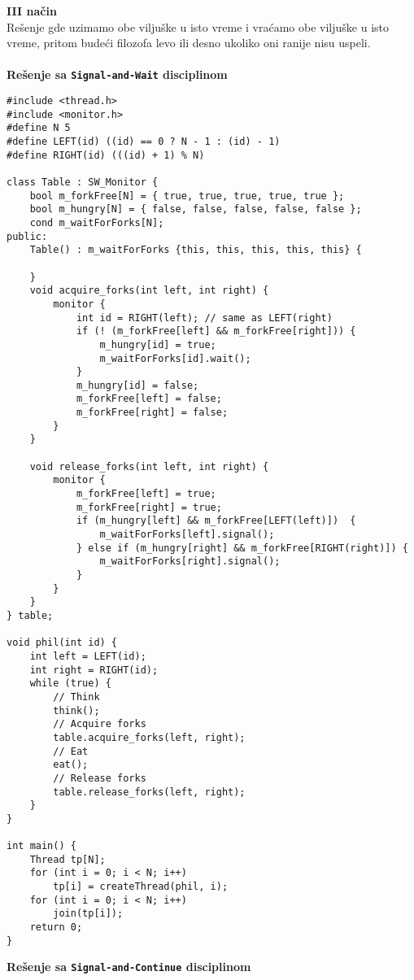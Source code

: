 \textbf{\large III na\v{c}in}\\
Re\v{s}enje gde uzimamo obe vilju\v{s}ke u isto vreme i vra\'{c}amo obe vilju\v{s}ke u isto vreme, pritom bude\'{c}i filozofa levo ili desno ukoliko oni ranije nisu uspeli.
\\\\
\textbf{Re\v{s}enje sa \texttt{Signal-and-Wait} disciplinom}
\begin{lstlisting}
#include <thread.h>
#include <monitor.h>
#define N 5
#define LEFT(id) ((id) == 0 ? N - 1 : (id) - 1)
#define RIGHT(id) (((id) + 1) % N)

class Table : SW_Monitor {
    bool m_forkFree[N] = { true, true, true, true, true };
    bool m_hungry[N] = { false, false, false, false, false };
    cond m_waitForForks[N];
public:
    Table() : m_waitForForks {this, this, this, this, this} {
        
    }
    void acquire_forks(int left, int right) {
        monitor {
            int id = RIGHT(left); // same as LEFT(right)
            if (! (m_forkFree[left] && m_forkFree[right])) {
                m_hungry[id] = true;
                m_waitForForks[id].wait();
            }
            m_hungry[id] = false;
            m_forkFree[left] = false;
            m_forkFree[right] = false;
        }
    }

    void release_forks(int left, int right) {
        monitor {
            m_forkFree[left] = true;
            m_forkFree[right] = true;
            if (m_hungry[left] && m_forkFree[LEFT(left)])  {
                m_waitForForks[left].signal();
            } else if (m_hungry[right] && m_forkFree[RIGHT(right)]) {
                m_waitForForks[right].signal();
            }
        }
    }
} table;

void phil(int id) {
    int left = LEFT(id);
    int right = RIGHT(id);
    while (true) {
        // Think
        think();
        // Acquire forks
        table.acquire_forks(left, right);
        // Eat
        eat();
        // Release forks
        table.release_forks(left, right);
    }
}

int main() {
    Thread tp[N];
    for (int i = 0; i < N; i++) 
        tp[i] = createThread(phil, i);
    for (int i = 0; i < N; i++) 
        join(tp[i]);
    return 0;
}

\end{lstlisting}
\textbf{Re\v{s}enje sa \texttt{Signal-and-Continue} disciplinom}
